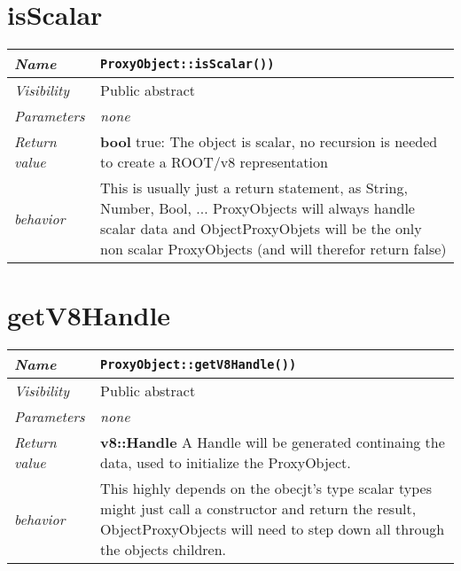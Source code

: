 \section{isScalar}
\begin{longtable}{p{3cm} @{\hskip 1cm} p{12cm}}
  \hline
  \textit{Name} & \texttt{ProxyObject::isScalar())} \\
  \hline
  \textit{Visibility} & Public abstract \\
  \hline
  \textit{Parameters} & \textit{none} \\
  \hline
  \textit{Return value} & \textbf{bool} true: The object is scalar, no recursion is needed to create a ROOT/v8 representation \\
  \hline
  \textit{behavior} & This is usually just a return statement, as String, Number, Bool, ... ProxyObjects will always handle scalar data and ObjectProxyObjets will be the only non scalar ProxyObjects (and will therefor return false) \\
  \hline
\end{longtable}
\section{getV8Handle}
\begin{longtable}{p{3cm} @{\hskip 1cm} p{12cm}}
  \hline
  \textit{Name} & \texttt{ProxyObject::getV8Handle())} \\
  \hline
  \textit{Visibility} & Public abstract \\
  \hline
  \textit{Parameters} & \textit{none} \\
  \hline
  \textit{Return value} & \textbf{v8::Handle} A Handle will be generated continaing the data, used to initialize the ProxyObject. \\
  \hline
  \textit{behavior} & This highly depends on the obecjt's type scalar types might just call a constructor and return the result, ObjectProxyObjects will need to step down all through the objects children. \\
  \hline
\end{longtable}
